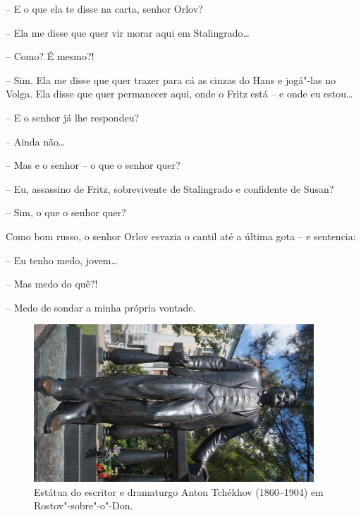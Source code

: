 -- E o que ela te disse na carta, senhor Orlov?

-- Ela me disse que quer vir morar aqui em Stalingrado\ldots{}

-- Como? É mesmo?!

-- Sim. Ela me disse que quer trazer para cá as cinzas do Hans e
jogá"-las no Volga. Ela disse que quer permanecer aqui, onde o Fritz está
-- e onde eu estou\ldots{}

-- E o senhor já lhe respondeu?

-- Ainda não\ldots{}

-- Mas e o senhor -- o que o senhor quer?

-- Eu, assassino de Fritz, sobrevivente de Stalingrado e confidente de
Susan?

-- Sim, o que o senhor quer?

Como bom russo, o senhor Orlov esvazia o cantil até a última gota -- e
sentencia:

-- Eu tenho medo, jovem\ldots{}

-- Mas medo do quê?!

-- Medo de sondar a minha própria vontade.

\pagebreak
\clearpage
\thispagestyle{empty}

\movetoevenpage
\begin{absolutelynopagebreak}
\begin{vplace}
\begin{figure}[H]
\begin{adjustwidth}{-2.7cm}{}
  \vspace{-2.8cm}
  \hspace{2.2cm}
  \includegraphics[width=105mm]{./imgs/rostov1.jpg}  
\end{adjustwidth}
  \caption{Estátua do escritor e dramaturgo Anton Tchékhov (1860--1904) em Rostov"-sobre"-o"-Don.}

\thispagestyle{empty}

\end{figure}
\end{vplace}

\end{absolutelynopagebreak}

